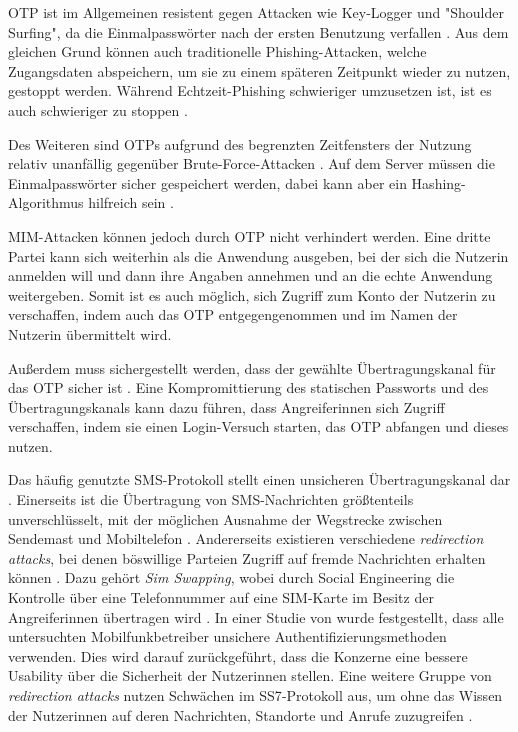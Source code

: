 \ac{OTP} ist im Allgemeinen resistent gegen Attacken wie Key-Logger und "Shoulder Surfing", da die Einmalpasswörter nach der ersten Benutzung verfallen \parencite{abhishekComprehensiveStudy2013}. Aus dem gleichen Grund können auch traditionelle Phishing-Attacken, welche Zugangsdaten abspeichern, um sie zu einem späteren Zeitpunkt wieder zu nutzen, gestoppt werden. Während Echtzeit-Phishing schwieriger umzusetzen ist, ist es auch schwieriger zu stoppen \parencite{langSecurityKeys2017}.

Des Weiteren sind \acp{OTP} aufgrund des begrenzten Zeitfensters der Nutzung relativ unanfällig gegenüber Brute-Force-Attacken \parencite{reeseUsabilityStudy2019}. Auf dem Server müssen die Einmalpasswörter sicher gespeichert werden, dabei kann aber ein Hashing-Algorithmus hilfreich sein \parencite{reeseUsabilityStudy2019}.

\ac{MIM}-Attacken können jedoch durch \ac{OTP} nicht verhindert werden. Eine dritte Partei kann sich weiterhin als die Anwendung ausgeben, bei der sich die Nutzerin anmelden will und dann ihre Angaben annehmen und an die echte Anwendung weitergeben. Somit ist es auch möglich, sich Zugriff zum Konto der Nutzerin zu verschaffen, indem auch das \ac{OTP} entgegengenommen und im Namen der Nutzerin übermittelt wird.

\pskip
Außerdem muss sichergestellt werden, dass der gewählte Übertragungskanal für das \ac{OTP} sicher ist \parencite{abhishekComprehensiveStudy2013}. Eine Kompromittierung des statischen Passworts und des Übertragungskanals kann dazu führen, dass Angreiferinnen sich Zugriff verschaffen, indem sie einen Login-Versuch starten, das \ac{OTP} abfangen und dieses nutzen.

Das häufig genutzte SMS-Protokoll stellt einen unsicheren Übertragungskanal dar \parencite{peetersSMSOTP2022}. Einerseits ist die Übertragung von SMS-Nachrichten größtenteils unverschlüsselt, mit der möglichen Ausnahme der Wegstrecke zwischen Sendemast und Mobiltelefon \parencite{peetersSMSOTP2022}. Andererseits existieren verschiedene \textit{redirection attacks}, bei denen böswillige Parteien Zugriff auf fremde Nachrichten erhalten können \parencite{peetersSMSOTP2022}. Dazu gehört \textit{Sim Swapping}, wobei durch Social Engineering die Kontrolle über eine Telefonnummer auf eine SIM-Karte im Besitz der Angreiferinnen übertragen wird \parencite{leeEmpiricalStudy2020}. In einer Studie von \textcite{leeEmpiricalStudy2020} wurde festgestellt, dass alle untersuchten Mobilfunkbetreiber unsichere Authentifizierungsmethoden verwenden. Dies wird darauf zurückgeführt, dass die Konzerne eine bessere Usability über die Sicherheit der Nutzerinnen stellen. Eine weitere Gruppe von \textit{redirection attacks} nutzen Schwächen im \ac{SS7}-Protokoll aus, um ohne das Wissen der Nutzerinnen auf deren Nachrichten, Standorte und Anrufe zuzugreifen \parencite{ullahSS7Vulnerabilities2020}.


